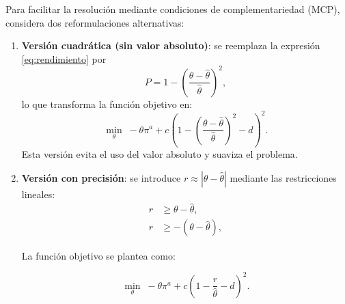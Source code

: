 Para facilitar la resolución mediante condiciones de complementariedad (MCP),  considera dos reformulaciones alternativas:

\begin{enumerate}
    \item \textbf{Versión cuadrática (sin valor absoluto)}: 
    se reemplaza la expresión \eqref{eq:rendimiento} por
    \begin{equation}\label{eq:rendimiento_cuad}
    P = 1 - \left(\frac{\theta - \hat{\theta}}{\hat{\theta}}\right)^2,
    \end{equation}
    lo que transforma la función objetivo en:
    \begin{equation}
    \min_{\theta} \; -\theta \pi^a + c\left(1 - \left(\frac{\theta - \hat{\theta}}{\hat{\theta}}\right)^2 - d\right)^2.
    \end{equation}
    Esta versión evita el uso del valor absoluto y suaviza el problema.

    \item \textbf{Versión con precisión}: 
    se introduce $r \approx |\theta - \hat{\theta}|$ mediante las restricciones lineales:
    \begin{align}
    r &\geq \theta - \hat{\theta}, \\
    r &\geq -(\theta - \hat{\theta}),
    \end{align}

La función objetivo se plantea como:

\begin{equation}\label{eq:welfare_oriented}
\min_{\theta} \; -\theta \pi^a + c\left(1 - \frac{r}{\hat{\theta}} - d\right)^2.
\end{equation}

\end{enumerate}



